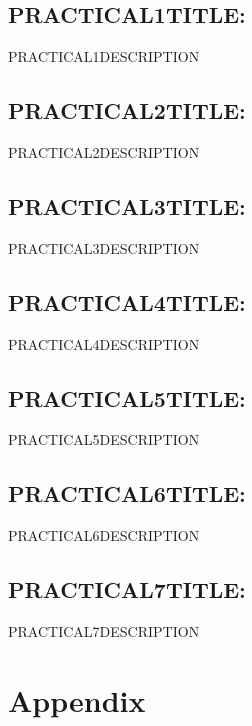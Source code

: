 \documentclass{article}
\begin{document}
\subsection{PRACTICAL1TITLE:} 
PRACTICAL1DESCRIPTION
 	
\subsection{PRACTICAL2TITLE:} 
PRACTICAL2DESCRIPTION
 	
\subsection{PRACTICAL3TITLE:} 
PRACTICAL3DESCRIPTION
 	
\subsection{PRACTICAL4TITLE:} 
PRACTICAL4DESCRIPTION
 	
\subsection{PRACTICAL5TITLE:} 
PRACTICAL5DESCRIPTION
 	
\subsection{PRACTICAL6TITLE:} 
PRACTICAL6DESCRIPTION
 	
\subsection{PRACTICAL7TITLE:} 
PRACTICAL7DESCRIPTION


\pagebreak

\section{Appendix}

\vspace{1cm}
\end{document}
